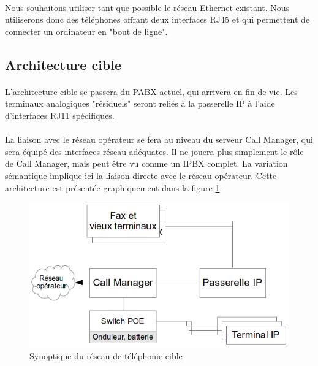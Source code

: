 \paragraph{} Nous souhaitons utiliser tant que possible le réseau Ethernet
existant. Nous utiliserons donc des téléphones offrant deux interfaces RJ45 et
qui permettent de connecter un ordinateur en "bout de ligne".

\subsection{Architecture cible}
\paragraph{} L'architecture cible se passera du PABX actuel, qui arrivera en fin
de vie. Les terminaux analogiques "résiduels" seront reliés à la passerelle IP à
l'aide d'interfaces RJ11 spécifiques.

\paragraph{} La liaison avec le réseau opérateur se fera au niveau du serveur
Call Manager, qui sera équipé des interfaces réseau adéquates. Il ne jouera plus
simplement le rôle de Call Manager, mais peut être vu comme un IPBX complet.
La variation sémantique implique ici la liaison directe avec le réseau
opérateur. Cette architecture est présentée graphiquement dans la figure
\ref{synoptique_cible}.

\begin{figure}[h]
  \caption{\label{synoptique_cible} Synoptique du réseau de téléphonie cible}
  \includegraphics{Cible.png}
\end{figure}

